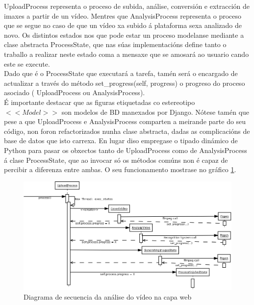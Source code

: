 		UploadProcess representa o proceso de subida, análise, conversión e extracción de imaxes
		a partir de un vídeo. Mentres que AnalysisProcess representa o proceso que se segue no 
		caso de que un vídeo xa subido á plataforma sexa analizado de novo. Os distintos estados
		nos que pode estar un proceso modelanse mediante a clase abstracta ProcessState, que nas
		súas implementacións define tanto o traballo a realizar neste estado coma a mensaxe que 
		se amosará ao usuario cando este se execute.\\
		
		Dado que é o ProcessState que executará a tarefa, tamén será o encargado de actualizar
		a través do método set\_progress(self, progress) o progreso do proceso asociado (
		UploadProcess ou AnalysisProcess).\\
		
		É importante destacar que as figuras etiquetadas co estereotipo $<<Model>>$ son modelos 
		de BD manexados por Django. Nótese tamén que pese a que UploadProcess e AnalysisProcess
		comparten a meirande parte do seu código, non foron refactorizados nunha clase abstracta,
		dadas as complicacións de base de datos que isto carrexa. En lugar diso empregase o 
		tipado dinámico de Python para pasar os obxectos tanto de UploadProcess como de 
		AnalysisProcess á clase ProcessState, que ao invocar só os métodos comúns non é capaz de 
		percibir a diferenza entre ambas. O seu funcionamento mostrase no gráfico
		\ref{fig:AnaliseVideoWeb}.
		
		\begin{figure}[htp]
		\begin{center}
			\includegraphics[scale=0.3]{figures/AnaliseVideoWeb.png}
			\caption{Diagrama de secuencia da análise do vídeo na capa web}
		\label{fig:AnaliseVideoWeb}
		\end{center}
		\end{figure}

